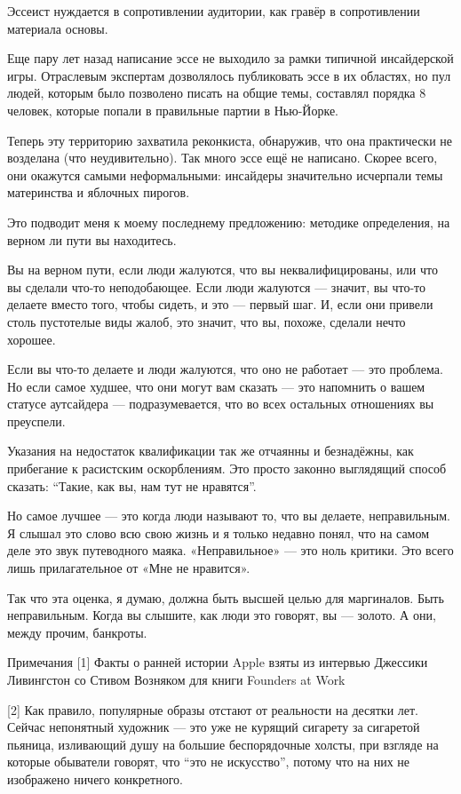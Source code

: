 \documentclass[ebook,12pt,oneside,openany]{memoir}
\begin{document}
Эссеист нуждается в сопротивлении аудитории, как гравёр в
сопротивлении материала основы.

Еще пару лет назад написание эссе не выходило за рамки типичной
инсайдерской игры. Отраслевым экспертам дозволялось публиковать эссе в
их областях, но пул людей, которым было позволено писать на общие
темы, составлял порядка 8 человек, которые попали в правильные партии
в Нью-Йорке.

Теперь эту территорию захватила реконкиста, обнаружив, что она
практически не возделана (что неудивительно). Так много эссе ещё не
написано. Скорее всего, они окажутся самыми неформальными: инсайдеры
значительно исчерпали темы материнства и яблочных пирогов.

Это подводит меня к моему последнему предложению: методике
определения, на верном ли пути вы находитесь.

Вы на верном пути, если люди жалуются, что вы неквалифицированы, или
что вы сделали что-то неподобающее. Если люди жалуются — значит, вы
что-то делаете вместо того, чтобы сидеть, и это — первый шаг. И, если
они привели столь пустотелые виды жалоб, это значит, что вы, похоже,
сделали нечто хорошее.

Если вы что-то делаете и люди жалуются, что оно не работает — это
проблема. Но если самое худшее, что они могут вам сказать — это
напомнить о вашем статусе аутсайдера — подразумевается, что во всех
остальных отношениях вы преуспели.

Указания на недостаток квалификации так же отчаянны и безнадёжны, как
прибегание к расистским оскорблениям. Это просто законно выглядящий
способ сказать: “Такие, как вы, нам тут не нравятся”.

Но самое лучшее — это когда люди называют то, что вы делаете,
неправильным. Я слышал это слово всю свою жизнь и я только недавно
понял, что на самом деле это звук путеводного маяка. «Неправильное» —
это ноль критики. Это всего лишь прилагательное от «Мне не нравится».

Так что эта оценка, я думаю, должна быть высшей целью для маргиналов.
Быть неправильным. Когда вы слышите, как люди это говорят, вы —
золото. А они, между прочим, банкроты.

Примечания [1] Факты о ранней истории Apple взяты из интервью Джессики
Ливингстон со Стивом Возняком для книги Founders at Work

[2] Как правило, популярные образы отстают от реальности на десятки
лет. Сейчас непонятный художник — это уже не курящий сигарету за
сигаретой пьяница, изливающий душу на большие беспорядочные холсты,
при взгляде на которые обыватели говорят, что “это не искусство”,
потому что на них не изображено ничего конкретного.
\end{document}
